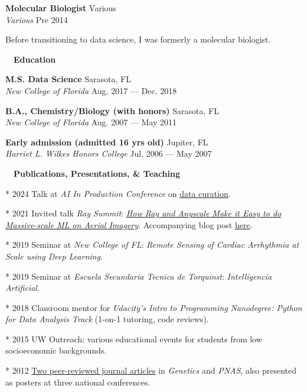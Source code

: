 \documentclass[a4paper,12pt]{article}
\newcommand{\resheading}[1]{{\hspace{-9pt} \colorbox{mygrey}{\begin{minipage}{\textwidth}{\textmd{~~\large \textbf{#1} \vphantom{p\^{E}}}}\end{minipage}}\vspace{6pt}} }
\newcommand{\ressubheading}[4]{{\begin{minipage}{\textwidth}
                                    \textbf{#1} \hfill #2 \\
                                    \textit{#3} \hfill #4 \\
\end{minipage}}}
\begin{document}
    \ressubheading{Molecular Biologist}{Various}{Various}{Pre 2014}

    \vspace{-6pt} Before transitioning to data science, I was formerly a molecular biologist.\\

    \resheading{Education}

    \ressubheading{M.S. Data Science}{Sarasota, FL}{New College of Florida}{Aug. 2017 --- Dec. 2018}


    \ressubheading{B.A., Chemistry/Biology (with honors)}{Sarasota, FL}{New College of Florida}{Aug. 2007 --- May 2011}

    \ressubheading{Early admission (admitted 16 yrs old)}{Jupiter, FL}{Harriet L. Wilkes Honors College}{Jul. 2006 --- May 2007}

    \resheading{Publications, Presentations, \& Teaching}
    * 2024 Talk at \textit{AI In Production Conference} on \href{https://www.aiinproduction.com/speakers/richard_decal}{data curation}.

    * 2021 Invited talk \textit{Ray Summit}: \href{https://www.anyscale.com/events/2021/06/22/how-ray-and-anyscale-make-it-easy-to-do-massive-scale-ml-on-aerial-imagery}{\textit{How Ray and Anyscale Make it Easy to do Massive-scale ML on Aerial Imagery}}. Accompanying blog post \href{https://www.anyscale.com/blog/how-ray-and-anyscale-make-it-easy-to-do-massive-scale-machine-learning-on}{here}.

    * 2019 Seminar at \textit{New College of FL}: \textit{Remote Sensing of Cardiac Arrhythmia at Scale using Deep Learning}.

    * 2019 Seminar at \textit{Escuela Secundaria Tecnica de Torquinst}: \textit{Intelligencia Artificial}.

    * 2018 Classroom mentor for \textit{Udacity's Intro to Programming Nanodegree: Python for Data Analysis Track} (1-on-1 tutoring, code reviews).

    * 2015 UW Outreach: various educational events for students from low socioeconomic backgrounds.

    * 2012 \href{https://scholar.google.co.nz/citations?user=4ODJ78oAAAAJ&hl=en}{Two peer-reviewed journal articles} in \textit{Genetics} and \textit{PNAS}, also presented as posters at three national conferences.
\end{document}
